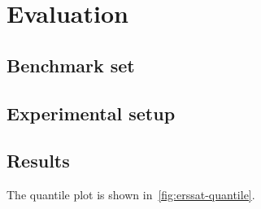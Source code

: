 \section{Evaluation}
\label{sect:erssat-evaluation}

\subsection{Benchmark set}

\subsection{Experimental setup}

\subsection{Results}

\begin{figure*}[t]
    \centering
    
    \caption{The quantile plot of application formulas}
    \label{fig:erssat-quantile}
\end{figure*}

The quantile plot is shown in~\cref{fig:erssat-quantile}.
